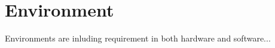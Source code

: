 \section{Environment}
\label{sec:environments}

Environments are inluding requirement in both hardware and software...
